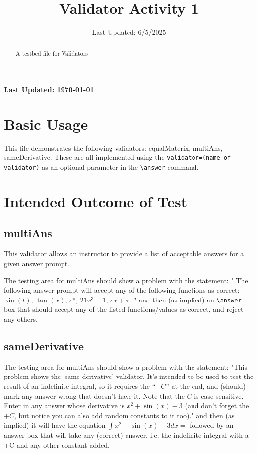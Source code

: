\documentclass{ximera}
\title{Validator Activity 1}
\date{Last Updated: 6/5/2025}
\begin{document}
\begin{abstract}
    A testbed file for Validators
\end{abstract}
\maketitle

{{\Huge \bfseries Last Updated: \today}} \\

\section{Basic Usage}

This file demonstrates the following validators: equalMaterix, multiAns, sameDerivative.
These are all implemented using the \verb|validator=(name of validator)| as an optional parameter in the \verb|\answer| command.

\section{Intended Outcome of Test}

    \subsection*{multiAns}
        This validator allows an instructor to provide a list of acceptable answers for a given answer prompt.

        The testing area for multiAns should show a problem with the statement: 
        " The following answer prompt will accept any of the following functions as correct: $\sin(t)$, $\tan(x)$, $e^\pi$, $21x^3 + 1$, $ex + \pi$. "
        and then (as implied) an \verb|\answer| box that should accept any of the listed functions/values as correct, and reject any others.

    \subsection*{sameDerivative}
        The testing area for multiAns should show a problem with the statement: 
        "This problem shows the 'same derivative' validator. It's intended to be used to test the result of an indefinite integral, so it requires the ``$+C$'' at the end, and (should) mark any answer wrong that doesn't have it. Note that the $C$ is case-sensitive. \\
            
            Enter in any answer whose derivative is $x^2 + \sin(x) - 3$ (and don't forget the $+C$, but notice you can also add random constants to it too)."
        and then (as implied) it will have the equation $\int x^2 + \sin(x) - 3 dx =$ followed by an answer box that will take any (correct) answer, i.e. the 
        indefinite integral with a +C and any other constant added.
\end{document}
